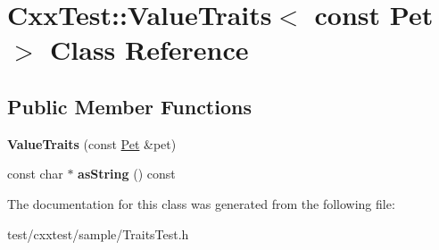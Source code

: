 \hypertarget{classCxxTest_1_1ValueTraits_3_01const_01Pet_01_4}{\section{Cxx\-Test\-:\-:Value\-Traits$<$ const Pet $>$ Class Reference}
\label{classCxxTest_1_1ValueTraits_3_01const_01Pet_01_4}
}
\subsection*{Public Member Functions}
\begin{DoxyCompactItemize}
\item 
\hypertarget{classCxxTest_1_1ValueTraits_3_01const_01Pet_01_4_ab277116369c0a64d4107e99b3599d571}{{\bfseries Value\-Traits} (const \hyperlink{classPet}{Pet} \&pet)}\label{classCxxTest_1_1ValueTraits_3_01const_01Pet_01_4_ab277116369c0a64d4107e99b3599d571}

\item 
\hypertarget{classCxxTest_1_1ValueTraits_3_01const_01Pet_01_4_a050ebf87d1de660e04e4bed5ba589e7e}{const char $\ast$ {\bfseries as\-String} () const }\label{classCxxTest_1_1ValueTraits_3_01const_01Pet_01_4_a050ebf87d1de660e04e4bed5ba589e7e}

\end{DoxyCompactItemize}


The documentation for this class was generated from the following file\-:\begin{DoxyCompactItemize}
\item 
test/cxxtest/sample/Traits\-Test.\-h\end{DoxyCompactItemize}
